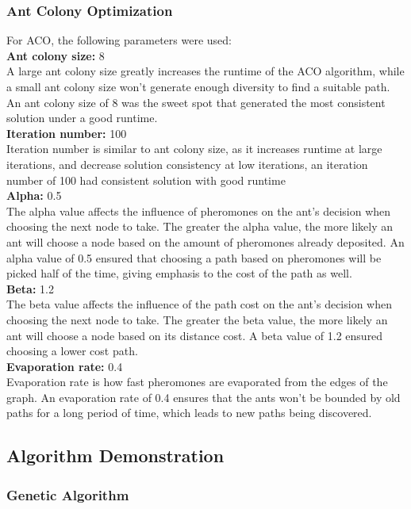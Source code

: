 \documentclass[conference]{IEEEtran}
\begin{document}
\subsubsection{Ant Colony Optimization}
For ACO, the following parameters were used:\\
\textbf{Ant colony size: } 8 \\
A large ant colony size greatly increases the runtime of the ACO algorithm, while a small ant colony size won't generate enough diversity to find a suitable path. An ant colony size of 8 was the sweet spot that generated the most consistent solution under a good runtime.\\
\textbf{Iteration number: } 100 \\
Iteration number is similar to ant colony size, as it increases runtime at large iterations, and decrease solution consistency at low iterations, an iteration number of 100 had consistent solution with good runtime \\
\textbf{Alpha: } 0.5 \\
The alpha value affects the influence of pheromones on the ant's decision when choosing the next node to take. The greater the alpha value, the more likely an ant will choose a node based on the amount of pheromones already deposited. An alpha value of 0.5 ensured that choosing a path based on pheromones will be picked half of the time, giving emphasis to the cost of the path as well.\\
\textbf{Beta: } 1.2 \\
The beta value affects the influence of the path cost on the ant's decision when choosing the next node to take. The greater the beta value, the more likely an ant will choose a node based on its distance cost. A beta value of 1.2 ensured choosing a lower cost path. \\
\textbf{Evaporation rate: } 0.4 \\
Evaporation rate is how fast pheromones are evaporated from the edges of the graph. An evaporation rate of 0.4 ensures that the ants won't be bounded by old paths for a long period of time, which leads to new paths being discovered.

\subsection{Algorithm Demonstration}
\subsubsection{Genetic Algorithm}
\end{document}
